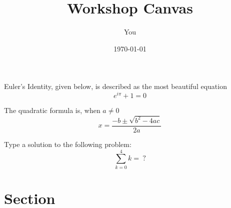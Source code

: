 \documentclass[11pt]{article}
\theoremstyle{definition}
\begin{document}
 
\title{Workshop Canvas}
\author{You}
\date{\today} 
\maketitle


Euler's Identity, given below, is described as the most beautiful equation
	\[e^{i\pi} + 1 = 0\]
	
The quadratic formula is, when $a \neq 0$
	\[x = \frac{-b \pm \sqrt{b^2 - 4ac}}{2a}\]

Type a solution to the following problem:
\[\sum_{k = 0}^4 k =\ ?\]


\section{Section}	






\end{document}
